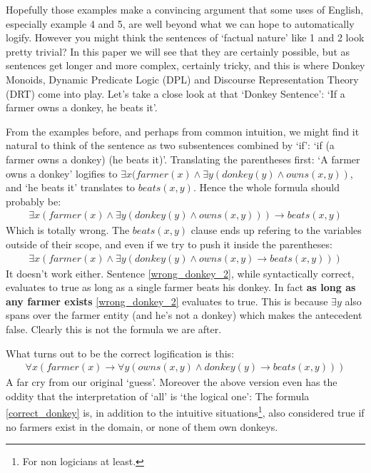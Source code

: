 \documentclass[12pt]{article}
\begin{document}
Hopefully those examples make a convincing argument that some uses of English, especially example 4 and 5, are well beyond what we can hope to automatically logify. However you might think the sentences of `factual nature' like 1 and 2 look pretty trivial? In this paper we will see that they are certainly possible, but as sentences get longer and more complex, certainly tricky, and this is where Donkey Monoids, Dynamic Predicate Logic (DPL) and Discourse Representation Theory (DRT) come into play. Let's take a close look at that `Donkey Sentence': `If a farmer owns a donkey, he beats it'.

From the examples before, and perhaps from common intuition, we might find it natural to think of the sentence as two subsentences combined by `if': `if (a farmer owns a donkey) (he beats it)'. Translating the parentheses first: `A farmer owns a donkey' logifies to $\exists x (farmer(x) \wedge \exists y (donkey(y)\wedge owns(x,y))$, and `he beats it' translates to $beats(x,y)$. Hence the whole formula should probably be:
%
\begin{align}
\exists x (farmer(x) \wedge \exists y (donkey(y)\wedge owns(x,y))) \rightarrow beats(x,y)
\end{align}
%
Which is totally wrong. The $beats(x,y)$ clause ends up refering to the variables outside of their scope, and even if we try to push it inside the parentheses:
%
\begin{align}
\exists x (farmer(x) \wedge \exists y (donkey(y)\wedge owns(x,y) \rightarrow beats(x,y))) \label{wrong_donkey_2}
\end{align}
%
It doesn't work either. Sentence \eqref{wrong_donkey_2}, while syntactically correct, evaluates to true as long as a single farmer beats his donkey. In fact \textbf{as long as any farmer exists} \eqref{wrong_donkey_2} evaluates to true. This is because $\exists y$ also spans over the farmer entity (and he's not a donkey) which makes the antecedent false. Clearly this is not the formula we are after.

What turns out to be the correct logification is this:
%
\begin{align}
\forall x (farmer(x) \rightarrow \forall y (owns(x,y) \wedge donkey(y) \rightarrow beats(x,y))) \label{correct_donkey}
\end{align}
%
A far cry from our original `guess'. Moreover the above version even has the oddity that the interpretation of `all' is `the logical one': The formula \eqref{correct_donkey} is, in addition to the intuitive situations\footnote{For non logicians at least.}, also considered true if no farmers exist in the domain, or none of them own donkeys.
\end{document}

